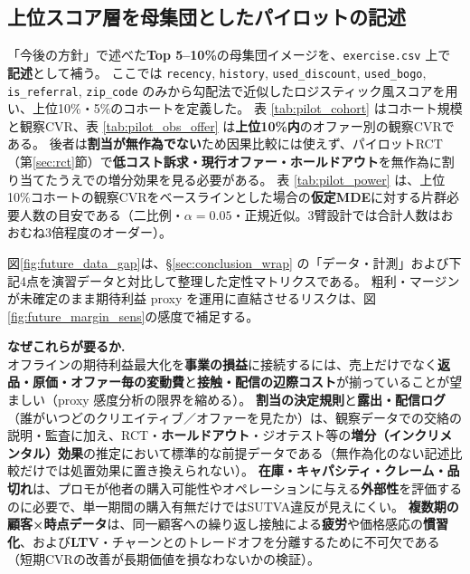 \documentclass[11pt,a4paper]{article}
\begin{document}
\FloatBarrier


\newpage
\subsection{上位スコア層を母集団としたパイロットの記述}
\label{sec:summary_pilot}
\noindent
「今後の方針」で述べた\textbf{Top 5--10\%}の母集団イメージを、\texttt{exercise.csv} 上で\textbf{記述}として補う。
ここでは \texttt{recency}, \texttt{history}, \texttt{used\_discount}, \texttt{used\_bogo}, \texttt{is\_referral}, \texttt{zip\_code} のみから勾配法で近似したロジスティック風スコアを用い、上位10\%・5\%のコホートを定義した。
表 \ref{tab:pilot_cohort} はコホート規模と観察CVR、表 \ref{tab:pilot_obs_offer} は\textbf{上位10\%内}のオファー別の観察CVRである。
後者は\textbf{割当が無作為でない}ため因果比較には使えず、パイロットRCT（第\ref{sec:rct}節）で\textbf{低コスト訴求・現行オファー・ホールドアウト}を無作為に割り当てたうえでの増分効果を見る必要がある。
表 \ref{tab:pilot_power} は、上位10\%コホートの観察CVRをベースラインとした場合の\textbf{仮定MDE}に対する片群必要人数の目安である（二比例・$\alpha=0.05$・正規近似。3臂設計では合計人数はおおむね3倍程度のオーダー）。

\FloatBarrier


\noindent 図\ref{fig:future_data_gap}は、\S\ref{sec:conclusion_wrap} の「データ・計測」および下記4点を演習データと対比して整理した定性マトリクスである。
粗利・マージンが未確定のまま期待利益 proxy を運用に直結させるリスクは、図\ref{fig:future_margin_sens}の感度で補足する。

\medskip\noindent
\textbf{なぜこれらが要るか.}\\
オフラインの期待利益最大化を\textbf{事業の損益}に接続するには、売上だけでなく\textbf{返品・原価・オファー毎の変動費}と\textbf{接触・配信の辺際コスト}が揃っていることが望ましい（proxy 感度分析の限界を縮める）。
\textbf{割当の決定規則}と\textbf{露出・配信ログ}（誰がいつどのクリエイティブ／オファーを見たか）は、観察データでの交絡の説明・監査に加え、RCT・\textbf{ホールドアウト}・ジオテスト等の\textbf{増分（インクリメンタル）効果}の推定において標準的な前提データである（無作為化のない記述比較だけでは処置効果に置き換えられない）。
\textbf{在庫・キャパシティ・クレーム・品切れ}は、プロモが他者の購入可能性やオペレーションに与える\textbf{外部性}を評価するのに必要で、単一期間の購入有無だけではSUTVA違反が見えにくい。
\textbf{複数期の顧客×時点データ}は、同一顧客への繰り返し接触による\textbf{疲労}や価格感応の\textbf{慣習化}、および\textbf{LTV}・チャーンとのトレードオフを分離するために不可欠である（短期CVRの改善が長期価値を損なわないかの検証）。
\end{document}
